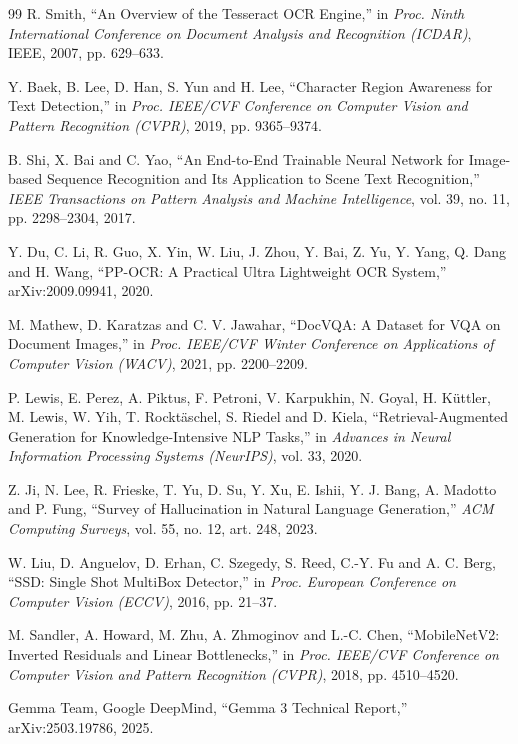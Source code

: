 \documentclass[12pt,singleside,a4paper]{article}
\begin{document}
{\begin{thebibliography}{99}
 R. Smith, ``An Overview of the Tesseract OCR Engine,'' in \textit{Proc. Ninth International Conference on Document Analysis and Recognition (ICDAR)}, IEEE, 2007, pp. 629--633.

 Y. Baek, B. Lee, D. Han, S. Yun and H. Lee, ``Character Region Awareness for Text Detection,'' in \textit{Proc. IEEE/CVF Conference on Computer Vision and Pattern Recognition (CVPR)}, 2019, pp. 9365--9374.

 B. Shi, X. Bai and C. Yao, ``An End-to-End Trainable Neural Network for Image-based Sequence Recognition and Its Application to Scene Text Recognition,'' \textit{IEEE Transactions on Pattern Analysis and Machine Intelligence}, vol. 39, no. 11, pp. 2298--2304, 2017.

 Y. Du, C. Li, R. Guo, X. Yin, W. Liu, J. Zhou, Y. Bai, Z. Yu, Y. Yang, Q. Dang and H. Wang, ``PP-OCR: A Practical Ultra Lightweight OCR System,'' arXiv:2009.09941, 2020.

 M. Mathew, D. Karatzas and C. V. Jawahar, ``DocVQA: A Dataset for VQA on Document Images,'' in \textit{Proc. IEEE/CVF Winter Conference on Applications of Computer Vision (WACV)}, 2021, pp. 2200--2209.

 P. Lewis, E. Perez, A. Piktus, F. Petroni, V. Karpukhin, N. Goyal, H. K\"{u}ttler, M. Lewis, W. Yih, T. Rockt\"{a}schel, S. Riedel and D. Kiela, ``Retrieval-Augmented Generation for Knowledge-Intensive NLP Tasks,'' in \textit{Advances in Neural Information Processing Systems (NeurIPS)}, vol. 33, 2020.

 Z. Ji, N. Lee, R. Frieske, T. Yu, D. Su, Y. Xu, E. Ishii, Y. J. Bang, A. Madotto and P. Fung, ``Survey of Hallucination in Natural Language Generation,'' \textit{ACM Computing Surveys}, vol. 55, no. 12, art. 248, 2023.

 W. Liu, D. Anguelov, D. Erhan, C. Szegedy, S. Reed, C.-Y. Fu and A. C. Berg, ``SSD: Single Shot MultiBox Detector,'' in \textit{Proc. European Conference on Computer Vision (ECCV)}, 2016, pp. 21--37.

 M. Sandler, A. Howard, M. Zhu, A. Zhmoginov and L.-C. Chen, ``MobileNetV2: Inverted Residuals and Linear Bottlenecks,'' in \textit{Proc. IEEE/CVF Conference on Computer Vision and Pattern Recognition (CVPR)}, 2018, pp. 4510--4520.

 Gemma Team, Google DeepMind, ``Gemma 3 Technical Report,'' arXiv:2503.19786, 2025.


\end{thebibliography}}
\end{document}
